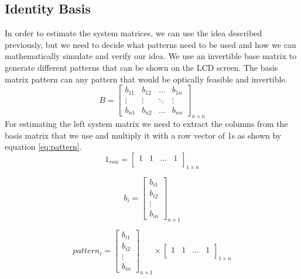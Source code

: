 \subsection{Identity Basis}
In order to estimate the system matrices, we can use the idea described previously, but we need to decide what patterns need to be used and how we can mathematically simulate and verify our idea. We use an invertible base matrix to generate different patterns that can be shown on the LCD screen. The basis matrix pattern can any pattern that would be optically feasible and invertible.
\begin{equation}
B = \begin{bmatrix} 
    b_{11} & b_{12} & \dots & b_{1n}\\
    \vdots & \vdots & \ddots &\vdots \\
    b_{n1} &  b_{n2} & \dots   & b_{nn} 
    \end{bmatrix}_{n\times n}
    \label{eq:basis_matr}
\end{equation}
For estimating the left system matrix we need to extract the columns from the basis matrix that we use and multiply it with a row vector of 1s as shown by equation \ref{eq:pattern}.
\begin{equation}
1_{row} = \begin{bmatrix} 
    1 & 1 & \dots &1\\

    \end{bmatrix}_{1\times n}
    \label{eq:one_row}
\end{equation}

\begin{equation}
b_{i} = \begin{bmatrix} 
    b_{i1} \\
    b_{i2} \\
    \vdots\\
    b_{in}
    \end{bmatrix}_{n\times 1}
    \label{eq:one_row}
\end{equation}


\begin{equation}
pattern_{i} = \begin{bmatrix} 
    b_{i1} \\
    b_{i2} \\
    \vdots\\
    b_{in}
    \end{bmatrix}_{n\times 1}\times
    \begin{bmatrix} 
    1 & 1 & \dots &1\\

    \end{bmatrix}_{1\times n}
  \label{eq:pattern}
\end{equation}

